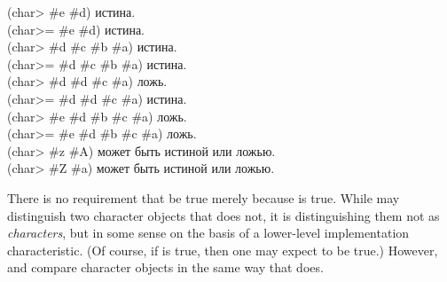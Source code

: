 \begin{defun}[Function]
\begin{lisp}
(char> \#{\Xbackslash}e \#{\Xbackslash}d) \textrm{истина.} \\
(char>= \#{\Xbackslash}e \#{\Xbackslash}d) \textrm{истина.} \\
(char> \#{\Xbackslash}d \#{\Xbackslash}c \#{\Xbackslash}b \#{\Xbackslash}a) \textrm{истина.} \\
(char>= \#{\Xbackslash}d \#{\Xbackslash}c \#{\Xbackslash}b \#{\Xbackslash}a) \textrm{истина.} \\
(char> \#{\Xbackslash}d \#{\Xbackslash}d \#{\Xbackslash}c \#{\Xbackslash}a) \textrm{ложь.} \\
(char>= \#{\Xbackslash}d \#{\Xbackslash}d \#{\Xbackslash}c \#{\Xbackslash}a) \textrm{истина.} \\
(char> \#{\Xbackslash}e \#{\Xbackslash}d \#{\Xbackslash}b \#{\Xbackslash}c \#{\Xbackslash}a) \textrm{ложь.} \\
(char>= \#{\Xbackslash}e \#{\Xbackslash}d \#{\Xbackslash}b \#{\Xbackslash}c \#{\Xbackslash}a) \textrm{ложь.} \\
(char> \#{\Xbackslash}z \#{\Xbackslash}A) \textrm{может быть истиной или ложью.} \\
(char> \#{\Xbackslash}Z \#{\Xbackslash}a) \textrm{может быть истиной или ложью.}
\end{lisp}

There is no requirement that  be true merely because
 is true.  While  may distinguish two character
objects that  does not, it is distinguishing them not
as \emph{characters}, but in some sense on the basis of a lower-level
implementation characteristic.
(Of course, if  is true,
then one may expect  to be true.)
However,  and 
compare character objects in the same
way that  does.
\end{defun}

